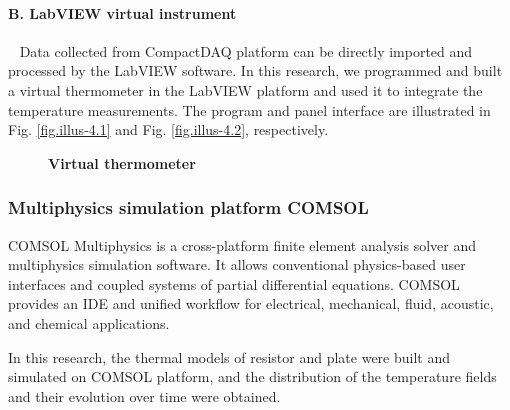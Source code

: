 \documentclass[10pt,a4paper,twocolumn,twoside,UTF8]{article}
\begin{document}
		\paragraph{B. LabVIEW virtual instrument}~
		\newline 
		Data collected from CompactDAQ platform can be directly imported and processed by the LabVIEW software. 
		In this research, we programmed and built a virtual thermometer in the LabVIEW platform and used it to integrate the temperature measurements. 
		The program and panel interface are illustrated in Fig. \ref{fig.illus-4.1} and Fig. \ref{fig.illus-4.2}, respectively.

		\begin{figure}[htbp]
			\centering
			\caption{\textbf{Virtual thermometer}}
		\end{figure}

		\subsubsection{Multiphysics simulation platform COMSOL}
		COMSOL Multiphysics is a cross-platform finite element analysis solver and multiphysics simulation software. 
		It allows conventional physics-based user interfaces and coupled systems of partial differential equations. 
		COMSOL provides an IDE and unified workflow for electrical, mechanical, fluid, acoustic, and chemical applications.

		In this research, the thermal models of resistor and plate were built and simulated on COMSOL platform, and the distribution of the temperature fields and their evolution over time were obtained. 
\end{document}
